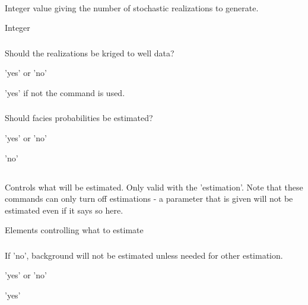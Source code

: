 \paragraph{}  
 \slist
   \item \Description Integer value giving the number of stochastic realizations to generate.
   \item \Argument Integer
   \item {}
 \elist

\subsubsection{}  
 \slist
   \item \Description Should the realizations be kriged to well data?
   \item \Argument 'yes' or 'no'
   \item \Default 'yes' if not the  command is used.
 \elist

\subsubsection{}  
 \slist
   \item \Description Should facies probabilities be estimated?
   \item \Argument 'yes' or 'no'
   \item \Default 'no'
 \elist




\subsection{} 
 \slist
   \item \Description Controls what will be estimated. Only valid with the  'estimation'. Note that these commands can only turn off estimations - a parameter that is given will not be estimated even if it says so here.
   \item \Argument Elements controlling what to estimate
   \item \Default
 \elist

\subsubsection{}  
 \slist
   \item \Description If 'no', background will not be estimated unless needed for other estimation.
   \item \Argument 'yes' or 'no'
   \item \Default 'yes'
 \elist

